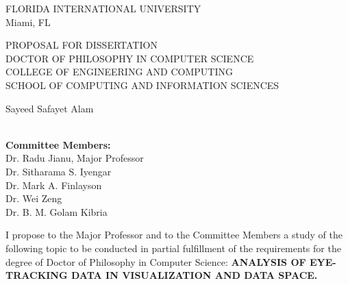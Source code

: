 \thispagestyle{empty}

\begin{titlepage}
\centering

FLORIDA INTERNATIONAL UNIVERSITY
\\
Miami, FL
\vfill


PROPOSAL FOR DISSERTATION
\\[0.4in]
DOCTOR OF PHILOSOPHY IN COMPUTER SCIENCE
\\[0.4in]
COLLEGE OF ENGINEERING AND COMPUTING
\\[0.4in]
SCHOOL OF COMPUTING AND INFORMATION SCIENCES
\\[0.4in]
\vfill



Sayeed Safayet Alam
\\[1in]
\the\year
\\\vfill

\textbf{Committee Members:}\\
Dr. Radu Jianu, Major Professor
\\
Dr. Sitharama S. Iyengar
\\
Dr. Mark A. Finlayson
\\
Dr. Wei Zeng
\\
Dr. B. M. Golam Kibria

\par
I propose to the Major Professor and to the Committee Members a study of the following topic to be conducted in partial fulfillment of the requirements for the degree of Doctor of Philosophy in Computer Science: \textbf{ANALYSIS OF EYE-TRACKING DATA IN VISUALIZATION AND DATA SPACE.}

\end{titlepage}